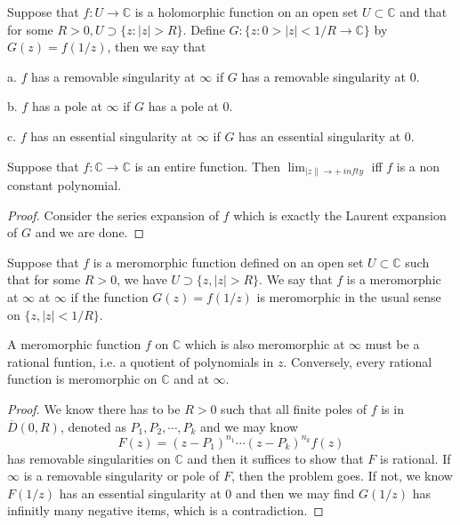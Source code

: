 \documentclass[lang=en, color=blue, ]{elegantbook}
\newcommand{\C}{\mathbb{C}}
\begin{document}
\begin{definition}
    Suppose that $f:U\to \C$ is a holomorphic function on an open set $U\subset\C$ and that for some $R>0, U\supset \{z:|z|>R\}$. Define
    $G:\{z:0>|z|<1/R \to \C\}$ by $G(z) = f(1/z)$, then we say that\par
    a. $f$ has a removable singularity at $\infty$ if $G$ has a removable singularity at $0$.\par
    b. $f$ has a pole at $\infty$ if $G$ has a pole at $0$.\par
    c. $f$ has an essential singularity at $\infty$ if $G$ has an essential singularity at $0$.
\end{definition}

\begin{theorem}
    Suppose that $f:\C\to\C$ is an entire function. Then $\lim_{|z\|\to +\ infty}$ iff $f$ is a non constant polynomial.
\end{theorem}
\begin{proof}\par
    Consider the series expansion of $f$ which is exactly the Laurent expansion of $G$ and we are done.
\end{proof}

\begin{definition}
    Suppose that $f$ is a meromorphic function defined on an open set $U\subset\C$ such that for some $R>0$, we have $U\supset\{z, |z|>R\}$. We say that $f$ is a meromorphic at $\infty$ at $\infty$ if the function $G(z) = f(1/z)$ is meromorphic in the usual sense on $\{z,|z|<1/R\}$.
\end{definition}

\begin{theorem}
    A meromorphic function $f$ on $\C$ which is also meromorphic at $\infty$ must be a rational funtion, i.e. a quotient of polynomials in $z$. Conversely, every rational function is meromorphic on $\C$ and at $\infty$.
\end{theorem}
\begin{proof}\par
    We know there has to be $R>0$ such that all finite poles of $f$ is in $\overline{D}(0,R)$, denoted as $P_1,P_2,\cdots,P_k$ and we may know
    \[F(z) = (z-P_1)^{n_1}\cdots(z-P_k)^{n_k}f(z)\]
    has removable singularities on $\C$ and then it suffices to show that $F$ is rational. If $\infty$ is a removable singularity or pole of $F$, then the problem goes. If not, we know $F(1/z)$ has an essential singularity at $0$ and then we may find $G(1/z)$ has infinitly many negative items, which is a contradiction. 
\end{proof}
\end{document}
